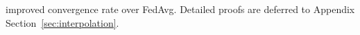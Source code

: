 improved convergence rate over FedAvg. Detailed proofs are deferred to Appendix Section~\ref{sec:interpolation}.
\begin{comment}
we deal with the question of whether FedAvg with momentum-based
local updates can outperform FedAvg with SGD updates. In contrast
to the gradient descent setting, Nesterov and Heavy Ball updates are
known to fail to accelerate over SGD, both in the overparameterized
setting and standard convex setting \cite{liu2018accelerating,kidambi2018insufficiency,liu2018toward,yuan2016influence}.
Thus in general one cannot hope to obtain acceleration results for
the FedAvg algorithm with Nesterov and Heavy Ball updates. On the
hopeful side, \cite{jain2017accelerating,liu2018accelerating} introduced
similar algorithms that make modifications of the Nesterov updates
to correct for its ``over-descent''. For quadratic objectives in
the overparamterized setting, \cite{liu2018accelerating} show their
algorithm achieves acceleration over the geometric convergence of
SGD that recovers the well-known $\mathcal{O}(\exp(-t/\sqrt{\kappa})$
acceleration of Nesterov over GD. In the last part, we introduce a
new accelerated FedAvg algorithm by adapting the MaSS algorithm of
\cite{liu2018accelerating} to the federated learning setting. We
show that it achieves geometric convergence for overparameterized
quadratic problems with rate $\mathcal{O}(\exp(-\frac{NT}{E\sqrt{\kappa_{1}\tilde{\kappa}}}))$,
where $\tilde{\kappa}$ is a ``statistical condition number''\cite{liu2018accelerating,jain2017accelerating}
that satisfies $\tilde{\kappa}\leq\kappa_{1}$. Thus our new FedAvg
algorithm achieves a speedup of factor $\sqrt{\kappa_{1}/\tilde{\kappa}}$
over FedAvg with local SGD updates. 
\end{comment}


